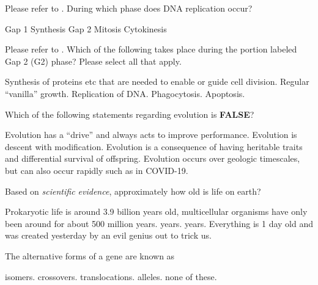 \documentclass[exam,addpoints,noanswers]{exam}
\begin{document}
\begin{questions}
\question[1] Please refer to . During which phase does DNA replication occur? 
\begin{choices}
\choice Gap 1
\CorrectChoice Synthesis
\choice Gap 2
\choice Mitosis
\choice Cytokinesis
\end{choices}

\question[1] Please refer to . Which of the following takes place during the portion labeled Gap 2 (G2) phase? Please select all that apply. 
\begin{choices}
\CorrectChoice Synthesis of proteins etc that are needed to enable or guide cell division.
\choice Regular ``vanilla'' growth.
\choice Replication of DNA.
\choice Phagocytosis.
\choice Apoptosis.  
\end{choices}

\clearpage
\question[1] Which of the following statements regarding evolution is \textbf{FALSE}?
\begin{choices}
\CorrectChoice Evolution has a ``drive'' and always acts to improve performance.
\choice Evolution is descent with modification.
\choice Evolution is a consequence of having heritable traits and differential survival of offspring.
\choice Evolution occurs over geologic timescales, but can also occur rapidly such as in COVID-19.
\end{choices}

\question[1] Based on \emph{scientific evidence}, approximately how old is life on earth?
\begin{choices}
\CorrectChoice Prokaryotic life is around 3.9 billion years old, multicellular organisms have only been around for about 500 million years.
 years.
 years.
\choice Everything is 1 day old and was created yesterday by an evil genius out to trick us. 
\end{choices}

\question[1] The alternative forms of a gene are known as
\begin{choices}
\choice isomers. 
\choice crossovers. 
\choice translocations. 
\CorrectChoice alleles. 
\choice none of these.
\end{choices}





\clearpage
\question
{}
\end{questions}
\end{document}
